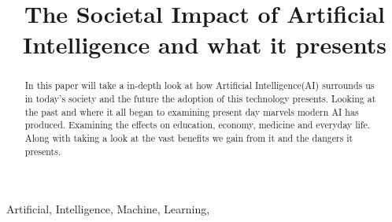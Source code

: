 \documentclass[conference]{IEEEtran}
\begin{document}
%


\title{The Societal Impact of Artificial Intelligence and what it presents}



\author{}



\maketitle


\begin{abstract}
In this paper will take a in-depth look at how Artificial Intelligence(AI) surrounds us in today's society and the future the adoption of this technology presents. Looking at the past and where it all began to examining present day marvels modern AI has produced. Examining the effects on education, economy, medicine and everyday life. Along with taking a look at the vast benefits we gain from it and the dangers it presents. 
\end{abstract}

\begin{IEEEkeywords}
Artificial, Intelligence, Machine, Learning,  
\end{IEEEkeywords}






\IEEEpeerreviewmaketitle
\end{document}

